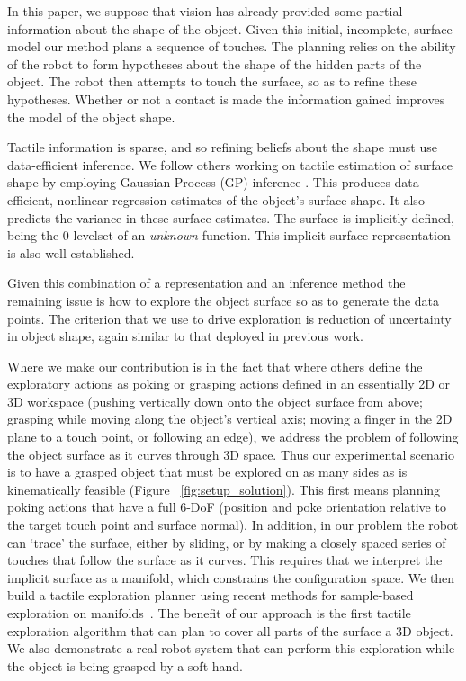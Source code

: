 In this paper, we suppose that vision has already provided some partial information about the shape of the object. Given this initial, incomplete, surface model our method plans a  sequence of touches. The planning relies on the ability of the robot to form hypotheses about the shape of the hidden parts of the object. The robot then attempts to touch the surface, so as to refine these hypotheses. Whether or not a contact is made the information gained improves the model of the object shape.

Tactile information is sparse, and so refining beliefs about the shape must use data-efficient inference. We follow others working on tactile estimation of surface shape \cite{Dragiev2011Gaussian,Bjorkman2013Enhancing,Sommer2014Bimanual} by employing Gaussian Process (GP) inference \cite{Rasmussen2006Gaussian}.  This produces data-efficient, nonlinear regression estimates of the object's surface shape. It also predicts the variance in these surface estimates. The surface is implicitly defined, being the $0$-levelset of an \emph{unknown} function. This implicit surface representation is also well established.

Given this combination of a representation and an inference method the remaining issue is how to explore the object surface so as to generate the data points. The criterion that we use to drive exploration is reduction of uncertainty in object shape, again similar to that deployed in previous work. 

Where we make our contribution is in the fact that where others define the exploratory actions as poking or grasping actions defined in an essentially 2D or 3D workspace (pushing vertically down onto the object surface from above; grasping while moving along the object's vertical axis; moving a finger in the 2D plane to a touch point, or following an edge), we address the problem of following the object surface as it curves through 3D space. Thus our experimental scenario is to have a grasped object that must be explored on as many sides as is kinematically feasible (Figure ~\ref{fig:setup_solution}). This first means planning poking actions that have a full 6-DoF (position and poke orientation relative to the target touch point and surface normal). In addition, in our problem the robot can `trace' the surface, either by sliding, or by making a closely spaced series of touches that follow the surface as it curves. This requires that we interpret the implicit surface as a manifold, which constrains the configuration space. We then build a tactile exploration planner using recent methods for sample-based exploration on manifolds~\cite{Jaillet2013Path}. The benefit of our approach is the first tactile exploration algorithm that can plan to cover all parts of the surface a 3D object. We also demonstrate a real-robot system that can perform this exploration while the object is being grasped by a soft-hand.

